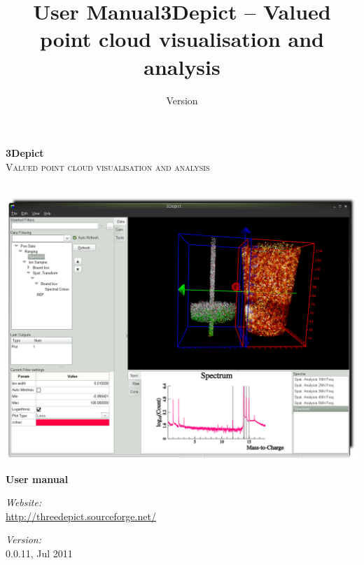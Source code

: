 \documentclass[10pt]{article}
\title{User Manual}
\date{Version}
\author{}
\begin{document}
\begin{titlepage}

\begin{center}
\vspace{3 cm}
\Huge \textbf{3Depict}\\[1.0cm]

\textsc{\Large Valued point cloud visualisation and analysis}\\
\hrulefill \\[1.0cm]

\begin{center}
 \includegraphics[width=\textwidth,keepaspectratio=true]{./figures/CoverImage.png}
\end{center}
\vspace{1.0 cm}


{ \Huge \bfseries User manual}\\[0.4cm]
\vspace{1.0 cm}


\begin{minipage}{0.5\textwidth}
\begin{flushleft} \large
\emph{Website:}\\
\url{http://threedepict.sourceforge.net/}\end{flushleft}
\end{minipage}
\begin{minipage}{0.3\textwidth}
\begin{flushright} \large
\emph{Version:} \\
 0.0.11, Jul 2011\end{flushright}
\end{minipage}

\vfill

\end{center}

\end{titlepage}
\clearpage
{}
\tableofcontents
\clearpage
{}
\title{3Depict -- Valued point cloud visualisation and analysis}
\end{document}
